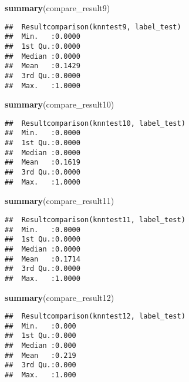 \documentclass[]{article}
\newenvironment{Shaded}{\begin{snugshade}}{\end{snugshade}}
\newcommand{\KeywordTok}[1]{\textcolor[rgb]{0.13,0.29,0.53}{\textbf{#1}}}
\newcommand{\NormalTok}[1]{#1}
\begin{document}
\begin{Shaded}
\begin{Highlighting}[]
\KeywordTok{summary}\NormalTok{(compare_result9)}
\end{Highlighting}
\end{Shaded}

\begin{verbatim}
##  Resultcomparison(knntest9, label_test)
##  Min.   :0.0000                        
##  1st Qu.:0.0000                        
##  Median :0.0000                        
##  Mean   :0.1429                        
##  3rd Qu.:0.0000                        
##  Max.   :1.0000
\end{verbatim}

\begin{Shaded}
\begin{Highlighting}[]
\KeywordTok{summary}\NormalTok{(compare_result10)}
\end{Highlighting}
\end{Shaded}

\begin{verbatim}
##  Resultcomparison(knntest10, label_test)
##  Min.   :0.0000                         
##  1st Qu.:0.0000                         
##  Median :0.0000                         
##  Mean   :0.1619                         
##  3rd Qu.:0.0000                         
##  Max.   :1.0000
\end{verbatim}

\begin{Shaded}
\begin{Highlighting}[]
\KeywordTok{summary}\NormalTok{(compare_result11)}
\end{Highlighting}
\end{Shaded}

\begin{verbatim}
##  Resultcomparison(knntest11, label_test)
##  Min.   :0.0000                         
##  1st Qu.:0.0000                         
##  Median :0.0000                         
##  Mean   :0.1714                         
##  3rd Qu.:0.0000                         
##  Max.   :1.0000
\end{verbatim}

\begin{Shaded}
\begin{Highlighting}[]
\KeywordTok{summary}\NormalTok{(compare_result12)}
\end{Highlighting}
\end{Shaded}

\begin{verbatim}
##  Resultcomparison(knntest12, label_test)
##  Min.   :0.000                          
##  1st Qu.:0.000                          
##  Median :0.000                          
##  Mean   :0.219                          
##  3rd Qu.:0.000                          
##  Max.   :1.000
\end{verbatim}
\end{document}
